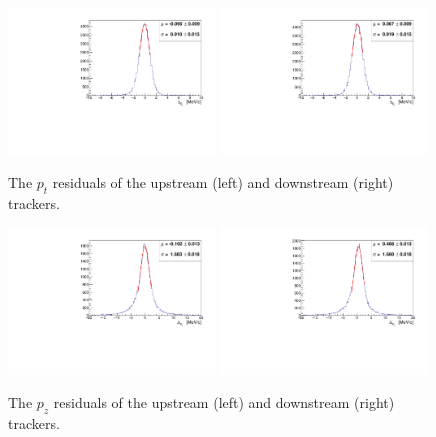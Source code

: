   
  \begin{figure}[p]
    \begin{center}
      \includegraphics[width=0.49\textwidth, angle=0]{08-Performance/upstream_pt_residual.pdf}
      \includegraphics[width=0.49\textwidth, angle=0]{08-Performance/downstream_pt_residual.pdf}
      \caption{\label{fig:PtResidKalman} The $p_{t}$ residuals of the upstream (left) and downstream (right) trackers.}
    \end{center}
  \end{figure}
  
   \begin{figure}[p]
    \begin{center}
      \includegraphics[width=0.49\textwidth, angle=0]{08-Performance/upstream_pz_residual.pdf}
      \includegraphics[width=0.49\textwidth, angle=0]{08-Performance/downstream_pz_residual.pdf}
      \caption{\label{fig:PzResidKalman} The $p_z$ residuals of the upstream (left) and downstream (right) trackers.}
    \end{center}
  \end{figure}
  
